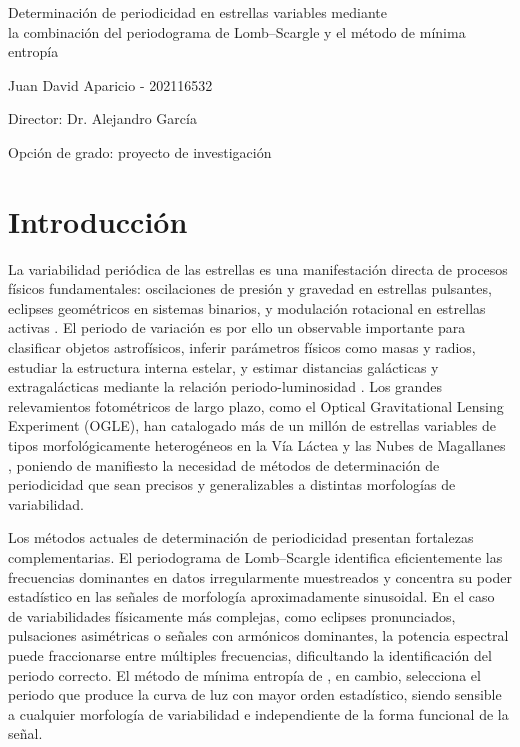 \documentclass[letterpaper,12pt]{extarticle}
\begin{document}
\begin{center}

    \Large Determinación de periodicidad en estrellas variables mediante\\
    la combinación del periodograma de Lomb--Scargle y el método de mínima entropía
    
    \vspace{3mm}

    \large Juan David Aparicio - 202116532

    \large Director: Dr. Alejandro García

    \vspace{3mm}

    \large Opción de grado: proyecto de investigación
    \normalsize 
\end{center}


\section{Introducción}

La variabilidad periódica de las estrellas es una manifestación directa de procesos
físicos fundamentales: oscilaciones de presión y gravedad en estrellas pulsantes,
eclipses geométricos en sistemas binarios, y modulación rotacional en estrellas activas \citep{Karttunen2016}.
El periodo de variación es por ello un observable importante para clasificar objetos
astrofísicos, inferir parámetros físicos como masas y radios, estudiar la estructura
interna estelar, y estimar distancias galácticas y extragalácticas mediante la relación periodo-luminosidad \citep{Ngeow_Gieren_Klein_2013}.
Los grandes relevamientos fotométricos de largo plazo, como el Optical Gravitational Lensing
Experiment (OGLE), han catalogado más de un millón de estrellas variables de tipos
morfológicamente heterogéneos en la Vía Láctea y las Nubes de Magallanes
\citep{iwanek_2025}, poniendo de manifiesto la necesidad de métodos de determinación
de periodicidad que sean precisos y generalizables a distintas morfologías de variabilidad.

Los métodos actuales de determinación de periodicidad presentan fortalezas
complementarias. El periodograma de Lomb--Scargle \citep{lomb_1976,scargle_1982} identifica
eficientemente las frecuencias dominantes en datos irregularmente muestreados
y concentra su poder estadístico en las señales de morfología aproximadamente
sinusoidal. En el caso de variabilidades físicamente más complejas, como eclipses pronunciados,
pulsaciones asimétricas o señales con armónicos dominantes, la potencia espectral puede
fraccionarse entre múltiples frecuencias, dificultando la identificación del periodo
correcto. El método de mínima entropía de \cite{cincotta_1995}, en cambio, selecciona
el periodo que produce la curva de luz con mayor orden estadístico,
siendo sensible a cualquier morfología de variabilidad e independiente de la forma
funcional de la señal.
\end{document}
